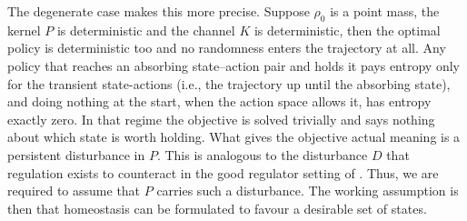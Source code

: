 \documentclass[11pt]{article}
\theoremstyle{remark}
\newcommand{\1}{\mathds{1}}
\begin{document}
The degenerate case makes this more precise.
Suppose $\rho_0$ is a point mass, the kernel $P$ is deterministic and the channel $K$ is deterministic, then the optimal policy is deterministic too and no randomness enters the trajectory at all.
Any policy that reaches an absorbing state--action pair and holds it pays entropy only for the transient state-actions (i.e., the trajectory up until the absorbing state), and doing nothing at the start, when the action space allows it, has entropy exactly zero.
In that regime the objective is solved trivially and says nothing about which state is worth holding.
What gives the objective actual meaning is a persistent disturbance in $P$.
This is analogous to the disturbance $D$ that regulation exists to counteract in the good regulator setting of \citet{Conant-good70}.
Thus, we are required to assume that $P$ carries such a disturbance.
The working assumption is then that homeostasis can be formulated to favour a desirable set of states.
\end{document}
